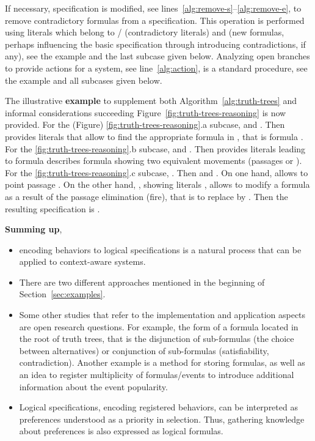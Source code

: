\documentclass[runningheads,a4paper]{llncs}
\begin{document}
If necessary,
specification  is modified,
see lines~\ref{alg:remove-s}--\ref{alg:remove-e},
to remove contradictory formulas from a specification.
This operation is performed using literals which belong to / (contradictory literals)
and  (new formulas, perhaps influencing the basic specification  through introducing contradictions, if any),
see the example and the last subcase given below.
Analyzing open branches  to provide actions for a system,
see line~\ref{alg:action},
is a standard procedure,
see the example and all subcases given below.

The illustrative \textbf{example}
to supplement both Algorithm~\ref{alg:truth-trees}
and informal considerations succeeding Figure~\ref{fig:truth-trees-reasoning}
is now provided.
For the (Figure) \ref{fig:truth-trees-reasoning}.a subcase,
 and
.
Then  provides literals that
allow to find the appropriate formula in ,
that is formula .
For the \ref{fig:truth-trees-reasoning}.b subcase,
 and
.
Then  provides literals leading
to formula  describes
formula showing two equivalent movements (passages  or ).
For the \ref{fig:truth-trees-reasoning}.c subcase,
.
Then  and .
On one hand,  allows to point passage .
On the other hand,
,
showing literals ,
allows to modify a formula as a result of the passage elimination (fire),
that is to replace  by
.
Then the resulting specification is
.

\textbf{Summing up},
\begin{itemize}
  \item encoding behaviors to logical specifications is a natural process that can be applied to context-aware systems.
  \item There are two different approaches mentioned in the beginning of Section~\ref{sec:examples}.
  \item Some other studies that refer to the implementation and application aspects are open research questions.
        For example,
        the form of a formula located in the root of truth trees,
        that is the disjunction of sub-formulas (the choice between alternatives) or
        conjunction of sub-formulas (satisfiability, contradiction).
        Another example is a method for storing formulas,
        as well as an idea to register multiplicity of formulas/events
        to introduce additional information about the event popularity.
  \item Logical specifications, encoding registered behaviors,
        can be interpreted as preferences understood as a priority in selection.
Thus, gathering knowledge about preferences is also expressed as logical formulas.
\end{itemize}
\end{document}
